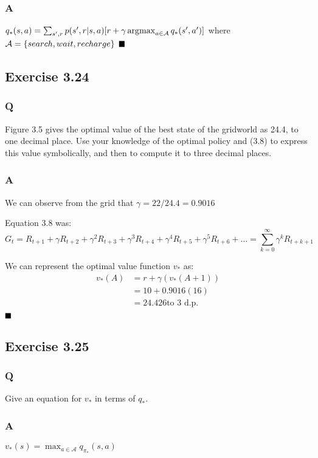 \subsubsection*{A}
$
q_*(s,a) =  \sum_{s',r} p(s',r | s, a) [r + \gamma \operatorname*{\arg\!\max}_{a \in \mathcal{A}} q_*(s', a')]
$
where $\mathcal{A} = \{\mathnormal{search}, \mathnormal{wait}, \mathnormal{recharge}\}$
$
\hfill \blacksquare
$

\subsection{Exercise 3.24}
\subsubsection*{Q}
Figure 3.5 gives the optimal value of the best state of the gridworld as 24.4, to one decimal place. Use your knowledge of the optimal policy and (3.8) to express this value symbolically, and then to compute it to three decimal places.

\subsubsection*{A}
We can observe from the grid that $\gamma = 22/24.4 = 0.9016$

Equation 3.8 was:
\begin{equation}
G_t = R_{t+1} + \gamma R_{t+2} + \gamma^2 R_{t+3} + \gamma^3 R_{t+4} + \gamma^4 R_{t+5} + \gamma^5 R_{t+6} + \ldots =  \sum_{k=0}^{\infty} \gamma^k R_{t+k+1}
\end{equation}

We can represent the optimal value function $v_*$ as:
\begin{align}
v_*(A) &= r + \gamma(v_*(A+1)) \\
 &= 10 + 0.9016(16) \\
 &= 24.426 \text{to 3 d.p.} \\
\end{align}
$
\hfill \blacksquare
$

\subsection{Exercise 3.25}
\subsubsection*{Q}
Give an equation for $v_*$ in terms of $q_*$.

\subsubsection*{A}
$
v_*(s) = \max_{a \in \mathcal{A}} q_{\pi_*}(s,a)
$

